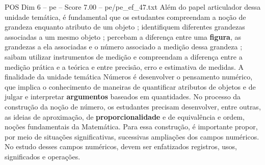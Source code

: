 \begin{textsample}{POS Dim 6 – pe – Score 7.00 – pe/pe\_ef\_47.txt}
Além do papel articulador dessa unidade temática, é fundamental que os estudantes compreendam a noção de grandeza enquanto atributo de um objeto ; identifiquem diferentes grandezas associadas a um mesmo objeto ; percebam a diferença entre uma \textbf{figura}, as grandezas a ela associadas e o número associado a medição dessa grandeza ; saibam utilizar instrumentos de medição e compreendam a diferença entre a medição prática e a teórica e entre precisão, erro e estimativa de medidas.
A finalidade da unidade temática Números é desenvolver o pensamento numérico, que implica o conhecimento de maneiras de quantificar atributos de objetos e de julgar e interpretar \textbf{argumentos} baseados em quantidades.
No processo da construção da noção de número, os estudantes precisam desenvolver, entre outras, as ideias de aproximação, de \textbf{proporcionalidade} e de equivalência e ordem, noções fundamentais da Matemática.
Para essa construção, é importante propor, por meio de situações significativas, sucessivas ampliações dos campos numéricos.
No estudo desses campos numéricos, devem ser enfatizados registros, usos, significados e operações.

\end{textsample}
